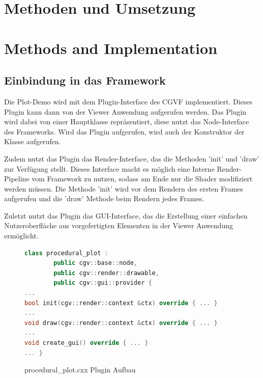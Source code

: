 {\chapter{Methoden und Umsetzung}}
{\chapter{Methods and Implementation}}
\label{sec:methods}

\section{Einbindung in das Framework}
Die Plot-Demo wird mit dem Plugin-Interface des CGVF implementiert.
Dieses Plugin kann dann von der Viewer Anwendung aufgerufen werden.
Das Plugin wird dabei von einer Hauptklasse repräsentiert, diese nutzt das Node-Interface des Frameworks.
Wird das Plugin aufgerufen, wird auch der Konstruktor der Klasse aufgerufen.
\par%
Zudem nutzt das Plugin das Render-Interface, das die Methoden 'init' und 'draw' zur Verfügung stellt.
Dieses Interface macht es möglich eine Interne Render-Pipeline vom Framework zu nutzen, sodass am Ende nur die Shader modifiziert werden müssen.
Die Methode 'init' wird vor dem Rendern des ersten Frames aufgerufen und die 'draw' Methode beim Rendern jedes Frames.
\par
Zuletzt nutzt das Plugin das GUI-Interface, das die Erstellung einer einfachen Nutzeroberfläche aus vorgefertigten Elementen in der Viewer Anwendung ermöglicht.
\begin{figure}[ht]
	\begin{lstlisting}[language=C++]
class procedural_plot :
        public cgv::base::node,
        public cgv::render::drawable,
        public cgv::gui::provider {
...
bool init(cgv::render::context &ctx) override { ... }
...
void draw(cgv::render::context &ctx) override { ... }
...
void create_gui() override { ... }
... }
	\end{lstlisting}
	\caption{procedural\_plot.cxx Plugin Aufbau}
	\label{fig:code_plugin}
\end{figure}



